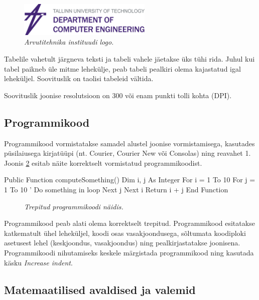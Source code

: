\documentclass[12pt]{article} %
\begin{document}
 \begin{figure}[h!]
 	\centering
 	\includegraphics[width=2.5in]{ATI_logo.png}
 	\caption{\it{Arvutitehnika instituudi logo.}}
 	\label{fig_ati_logo}
 \end{figure}

Tabelile vahetult järgneva teksti ja tabeli vahele jäetakse üks tühi rida. Juhul kui tabel paikneb üle mitme lehekülje, peab tabeli pealkiri olema kajastatud igal leheküljel. Soovituslik on taolisi tabeleid vältida.

Soovituslik joonise resolutsioon on 300 või enam punkti tolli kohta (DPI).

\subsection{Programmikood}
\label{Programmikood} %

Programmikood vormistatakse samadel alustel joonise vormistamisega, kasutades püsilaiusega kirjatüüpi (nt. Courier, Courier New või Consolas) ning reavahet 1.  Joonis \ref{fig_program_code} esitab näite korrektselt vormistatud programmikoodist. 


\begin{verbbox}
Public Function computeSomething()
   Dim i, j As Integer
   For i = 1 To 10
     For j = 1 To 10
        ' Do something in loop
      Next j
   Next i
   Return i + j
End Function
\end{verbbox}

\begin{figure} [h!] %
\centering
\theverbbox
\caption{\it{Trepitud programmikoodi näidis.}}
\label{fig_program_code}
\end{figure}

Programmikood peab alati olema korrektselt trepitud. Programmikood esitatakse katkematult ühel leheküljel, koodi osas vasakjoondusega, sõltumata koodiploki asetusest lehel (keskjoondus, vasakjoondus) ning pealkirjastatakse joonisena. Programmikoodi nihutamiseks keskele märgistada programmikood ning kasutada käsku \textit{Increase indent}.

\subsection{Matemaatilised avaldised ja valemid}
\label{Matemaatilised avaldised ja valemid} %
\end{document}
